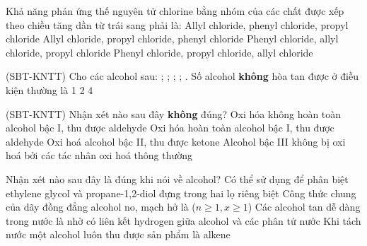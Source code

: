 \documentclass[12pt,a4paper]{article}
\begin{document}
\begin{ex}
Khả năng phản ứng thế nguyên tử chlorine bằng nhóm  của các chất được xếp theo chiều tăng dần từ trái sang phải là:
\choice
{Allyl chloride, phenyl chloride, propyl chloride}
{Allyl chloride, propyl chloride, phenyl chloride}
{Phenyl chloride, allyl chloride, propyl chloride}
{\True Phenyl chloride, propyl chloride, allyl chloride}
\end{ex}

\begin{ex}
(SBT-KNTT) Cho các alcohol sau: ; ; ; ; . Số alcohol \textbf{không} hòa tan được  ở điều kiện thường là
\choice
{1}
{2}
{}
{4}
\end{ex}

\begin{ex}
(SBT-KNTT) Nhận xét nào sau đây \textbf{không} đúng?
\choice
{Oxi hóa không hoàn toàn alcohol bậc I, thu được aldehyde}
{\True Oxi hóa hoàn toàn alcohol bậc I, thu được aldehyde}
{Oxi hoá alcohol bậc II, thu được ketone}
{Alcohol bậc III không bị oxi hoá bởi các tác nhân oxi hoá thông thường}
\end{ex}

\begin{ex}
Nhận xét nào sau đây là đúng khi nói về alcohol?
\choice
{Có thể sử dụng  để phân biệt ethylene glycol và propane-1,2-diol đựng trong hai lọ riêng biệt}
{Công thức chung của dãy đồng đẳng alcohol no, mạch hở là  ($n \ge 1, x \ge 1$)}
{\True Các alcohol tan dễ dàng trong nước là nhờ có liên kết hydrogen giữa alcohol và các phân tử nước}
{Khi tách nước một alcohol luôn thu được sản phẩm là alkene}
\end{ex}
\end{document}
